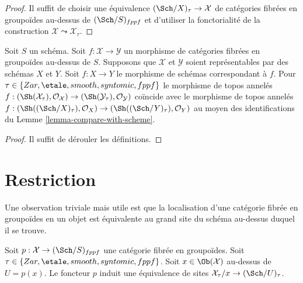 \begin{proof}
Il suffit de choisir une équivalence
$(\Sch/X)_\tau \to \mathcal{X}$ de catégories fibrées en groupoïdes
au-dessus de $(\Sch/S)_{fppf}$ et d'utiliser la fonctorialité de
la construction $\mathcal{X} \leadsto \mathcal{X}_\tau$.
\end{proof}

\begin{lemma}
\label{lemma-compare-with-morphism-of-schemes}
Soit $S$ un schéma. Soit $f : \mathcal{X} \to \mathcal{Y}$ un morphisme
de catégories fibrées en groupoïdes au-dessus de $S$.
Supposons que $\mathcal{X}$ et $\mathcal{Y}$ soient représentables par des schémas
$X$ et $Y$. Soit $f : X \to Y$ le morphisme de schémas correspondant
à $f$. Pour $\tau \in \{Zar,\linebreak[0] \etale,\linebreak[0]
smooth,\linebreak[0] syntomic,\linebreak[0] fppf\}$
le morphisme de topos annelés
$f : (\Sh(\mathcal{X}_\tau), \mathcal{O}_\mathcal{X}) \to
(\Sh(\mathcal{Y}_\tau), \mathcal{O}_\mathcal{Y})$
coïncide avec le morphisme de topos annelés
$f : (\Sh((\Sch/X)_\tau), \mathcal{O}_X) \to 
(\Sh((\Sch/Y)_\tau), \mathcal{O}_Y)$ au moyen des identifications du
Lemme \ref{lemma-compare-with-scheme}.
\end{lemma}

\begin{proof}
Il suffit de dérouler les définitions.
\end{proof}




\section{Restriction}
\label{section-restriction}


\noindent
Une observation triviale mais utile est que la localisation
d'une catégorie fibrée en groupoïdes en un objet
est équivalente au grand site du schéma au-dessus duquel il se trouve.

\begin{lemma}
\label{lemma-localizing}
Soit $p : \mathcal{X} \to (\Sch/S)_{fppf}$ une catégorie fibrée
en groupoïdes. Soit $\tau \in \{Zar, \etale, smooth, syntomic, fppf\}$.
Soit $x \in \Ob(\mathcal{X})$ au-dessus de $U = p(x)$.
Le foncteur $p$ induit une équivalence de sites
$\mathcal{X}_\tau/x \to (\Sch/U)_\tau$.
\end{lemma}

